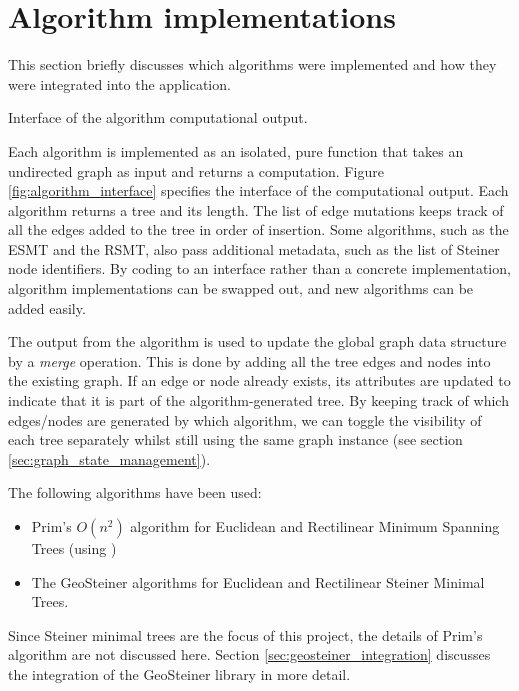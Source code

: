 \documentclass{l4proj}
\begin{document}
\section{Algorithm implementations}
\label{sec:algorithm_implementations}
This section briefly discusses which algorithms were implemented and how they were integrated into the application.
\begin{wrapstuff}[r,width=0.3\textwidth,type=figure]
    \centering
    \caption{Interface of the algorithm computational output.}
    
    \label{fig:algorithm_interface}
\end{wrapstuff}
Each algorithm is implemented as an isolated, pure function that takes an undirected graph as input and returns a computation.
Figure \ref{fig:algorithm_interface} specifies the interface of the computational output. Each algorithm returns a tree and its length. The list of edge mutations keeps track of all the edges added to the tree in order of insertion. Some algorithms, such as the ESMT and the RSMT, also pass additional metadata, such as the list of Steiner node identifiers.
By coding to an interface rather than a concrete implementation, algorithm implementations can be swapped out, and new algorithms can be added easily.

The output from the algorithm is used to update the global graph data structure by a \textit{merge} operation. This is done by adding all the tree edges and nodes into the existing graph. If an edge or node already exists, its attributes are updated to indicate that it is part of the algorithm-generated tree. By keeping track of which edges/nodes are generated by which algorithm, we can toggle the visibility of each tree separately whilst still using the same graph instance (see section \ref{sec:graph_state_management}).

\wrapstuffclear

The following algorithms have been used:
\begin{itemize}
    \item Prim's $O(n^2)$ algorithm for Euclidean and Rectilinear Minimum Spanning Trees (using \citep[pp. 194--195]{Skiena2008})
    \item The GeoSteiner algorithms for Euclidean and Rectilinear Steiner Minimal Trees.
\end{itemize}

Since Steiner minimal trees are the focus of this project, the details of Prim's algorithm are not discussed here. Section \ref{sec:geosteiner_integration} discusses the integration of the GeoSteiner library in more detail.
\end{document}
